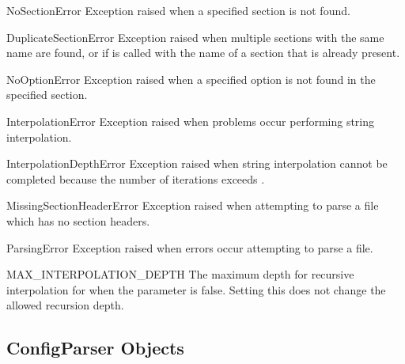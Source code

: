 \begin{excdesc}{NoSectionError}
Exception raised when a specified section is not found.
\end{excdesc}

\begin{excdesc}{DuplicateSectionError}
Exception raised when multiple sections with the same name are found,
or if  is called with the name of a section that 
is already present.
\end{excdesc}

\begin{excdesc}{NoOptionError}
Exception raised when a specified option is not found in the specified 
section.
\end{excdesc}

\begin{excdesc}{InterpolationError}
Exception raised when problems occur performing string interpolation.
\end{excdesc}

\begin{excdesc}{InterpolationDepthError}
Exception raised when string interpolation cannot be completed because
the number of iterations exceeds .
\end{excdesc}

\begin{excdesc}{MissingSectionHeaderError}
Exception raised when attempting to parse a file which has no section
headers.
\end{excdesc}

\begin{excdesc}{ParsingError}
Exception raised when errors occur attempting to parse a file.
\end{excdesc}

\begin{datadesc}{MAX_INTERPOLATION_DEPTH}
The maximum depth for recursive interpolation for  when
the  parameter is false.  Setting this does not change the
allowed recursion depth.
\end{datadesc}


\begin{seealso}
\end{seealso}


\subsection{ConfigParser Objects \label{ConfigParser-objects}}

